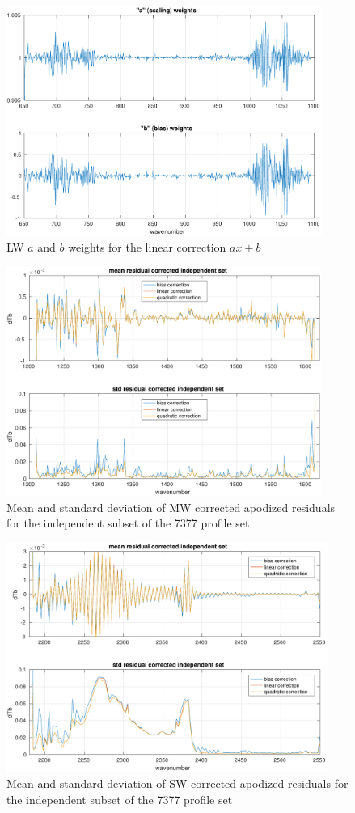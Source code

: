 \documentclass[11pt]{article}
\begin{document}
\begin{figure} %
  \centering
  \includegraphics[height=7.5cm]{figures/a2cris_coef_LW.pdf}
  \caption{LW $a$ and $b$ weights for the linear correction $ax+b$}
  \label{coefLW}
\end{figure}

\begin{figure} %
  \centering
  \includegraphics[height=7.5cm]{figures/a2cris_stat_MW.pdf}
  \caption{Mean and standard deviation of MW corrected apodized
    residuals for the independent subset of the 7377 profile set}
  \label{statMW}
\end{figure}

\begin{figure} %
  \centering
  \includegraphics[height=7.5cm]{figures/a2cris_stat_SW.pdf}
  \caption{Mean and standard deviation of SW corrected apodized
    residuals for the independent subset of the 7377 profile set}
  \label{statSW}
\end{figure}
\end{document}
